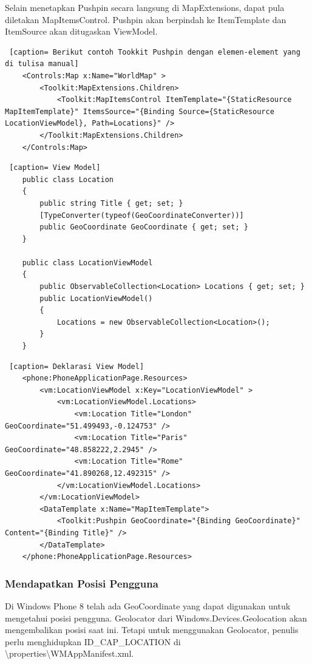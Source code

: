 \hspace{0.5cm} Selain menetapkan Pushpin secara langsung  di MapExtensions, dapat pula diletakan MapItemsControl. Pushpin akan berpindah ke ItemTemplate dan ItemSource akan ditugaskan ViewModel.

\begin{lstlisting} [caption= Berikut contoh Tookkit Pushpin dengan elemen-element yang di tulisa manual]
	<Controls:Map x:Name="WorldMap" >
		<Toolkit:MapExtensions.Children>
			<Toolkit:MapItemsControl ItemTemplate="{StaticResource MapItemTemplate}" ItemsSource="{Binding Source={StaticResource LocationViewModel}, Path=Locations}" />
		</Toolkit:MapExtensions.Children>
	</Controls:Map>
\end{lstlisting}

\begin{lstlisting} [caption= View Model]
	public class Location
	{
		public string Title { get; set; }
		[TypeConverter(typeof(GeoCoordinateConverter))]
		public GeoCoordinate GeoCoordinate { get; set; }
	}
	
	public class LocationViewModel
	{
		public ObservableCollection<Location> Locations { get; set; }
		public LocationViewModel()
		{
			Locations = new ObservableCollection<Location>();
		}
	}
\end{lstlisting}

\begin{lstlisting} [caption= Deklarasi View Model]
	<phone:PhoneApplicationPage.Resources>
		<vm:LocationViewModel x:Key="LocationViewModel" >
			<vm:LocationViewModel.Locations>
				<vm:Location Title="London" GeoCoordinate="51.499493,-0.124753" />
				<vm:Location Title="Paris" GeoCoordinate="48.858222,2.2945" />
				<vm:Location Title="Rome" GeoCoordinate="41.890268,12.492315" />
			</vm:LocationViewModel.Locations>
		</vm:LocationViewModel>
		<DataTemplate x:Name="MapItemTemplate">
			<Toolkit:Pushpin GeoCoordinate="{Binding GeoCoordinate}" Content="{Binding Title}" />
		</DataTemplate>
	</phone:PhoneApplicationPage.Resources>
\end{lstlisting}

\subsubsection{Mendapatkan Posisi Pengguna}
\label{subsubsec:Mendapatkan Posisi Pengguna}
\hspace{0.5cm} Di Windows Phone 8 telah ada GeoCoordinate yang dapat digunakan untuk mengetahui posisi pengguna. Geolocator dari Windows.Devices.Geolocation akan mengembalikan posisi saat ini. Tetapi untuk menggunakan Geolocator, penulis perlu menghidupkan ID\_CAP\_LOCATION di \textbackslash properties\textbackslash WMAppManifest.xml. 

